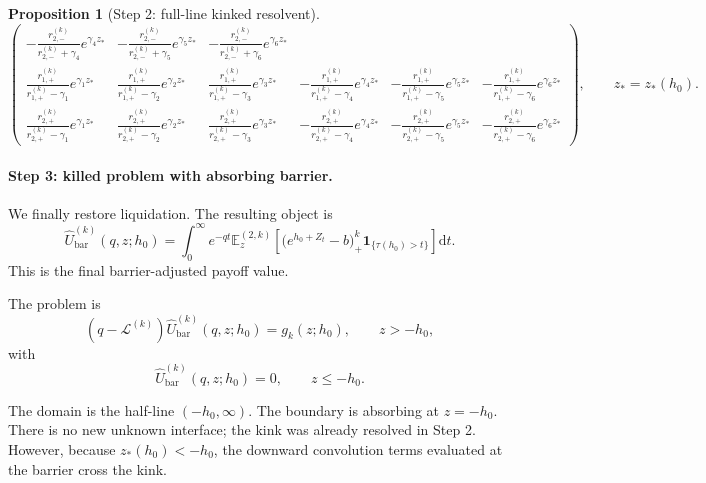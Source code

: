 \documentclass{article}
\newcommand{\E}{\mathbb{E}}
\newcommand{\diff}{\mathrm{d}}
\newcommand{\one}{\mathbf{1}}
\theoremstyle{definition}
\newtheorem{proposition}{Proposition}[section]
\begin{document}
\begin{proposition}[Step 2: full-line kinked resolvent]
\[\begin{pmatrix}
-\frac{r_{2,-}^{(k)}}{r_{2,-}^{(k)}+\gamma_4}e^{\gamma_4 z_*} &
-\frac{r_{2,-}^{(k)}}{r_{2,-}^{(k)}+\gamma_5}e^{\gamma_5 z_*} &
-\frac{r_{2,-}^{(k)}}{r_{2,-}^{(k)}+\gamma_6}e^{\gamma_6 z_*}\\
\frac{r_{1,+}^{(k)}}{r_{1,+}^{(k)}-\gamma_1}e^{\gamma_1 z_*} &
\frac{r_{1,+}^{(k)}}{r_{1,+}^{(k)}-\gamma_2}e^{\gamma_2 z_*} &
\frac{r_{1,+}^{(k)}}{r_{1,+}^{(k)}-\gamma_3}e^{\gamma_3 z_*} &
-\frac{r_{1,+}^{(k)}}{r_{1,+}^{(k)}-\gamma_4}e^{\gamma_4 z_*} &
-\frac{r_{1,+}^{(k)}}{r_{1,+}^{(k)}-\gamma_5}e^{\gamma_5 z_*} &
-\frac{r_{1,+}^{(k)}}{r_{1,+}^{(k)}-\gamma_6}e^{\gamma_6 z_*}\\
\frac{r_{2,+}^{(k)}}{r_{2,+}^{(k)}-\gamma_1}e^{\gamma_1 z_*} &
\frac{r_{2,+}^{(k)}}{r_{2,+}^{(k)}-\gamma_2}e^{\gamma_2 z_*} &
\frac{r_{2,+}^{(k)}}{r_{2,+}^{(k)}-\gamma_3}e^{\gamma_3 z_*} &
-\frac{r_{2,+}^{(k)}}{r_{2,+}^{(k)}-\gamma_4}e^{\gamma_4 z_*} &
-\frac{r_{2,+}^{(k)}}{r_{2,+}^{(k)}-\gamma_5}e^{\gamma_5 z_*} &
-\frac{r_{2,+}^{(k)}}{r_{2,+}^{(k)}-\gamma_6}e^{\gamma_6 z_*}
\end{pmatrix},
\qquad z_*=z_*(h_0).
\]
\end{proposition}

\paragraph{Step 3: killed problem with absorbing barrier.}
We finally restore liquidation. The resulting object is
\[
\widehat U_{\mathrm{bar}}^{(k)}(q,z;h_0)
=
\int_0^\infty e^{-qt}
\E_z^{(2,k)}\!\left[\big(e^{h_0+Z_t}-b\big)_+^k\one_{\{\tau(h_0)>t\}}\right]\diff t.
\]
This is the final barrier-adjusted payoff value.

The problem is
\[
(q-\mathcal L^{(k)})\widehat U_{\mathrm{bar}}^{(k)}(q,z;h_0)
=
g_k(z;h_0),
\qquad z>-h_0,
\]
with
\[
\widehat U_{\mathrm{bar}}^{(k)}(q,z;h_0)=0,
\qquad z\le -h_0.
\]

The domain is the half-line $(-h_0,\infty)$. The boundary is absorbing at $z=-h_0$. There is no new unknown interface;
the kink was already resolved in Step 2. However, because $z_*(h_0)<-h_0$, the downward convolution terms evaluated at
the barrier cross the kink.
\end{document}
